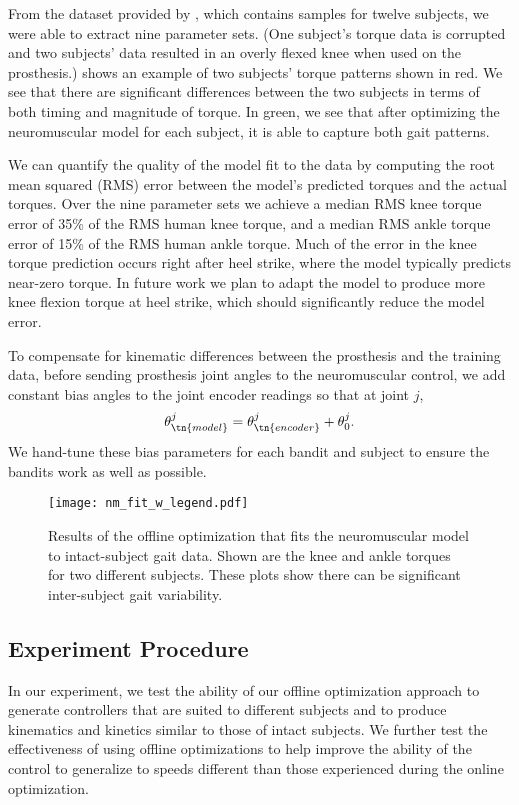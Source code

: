 From the dataset provided by \citet{moore2015elaborate}, which contains samples
for twelve subjects, we were able to extract nine parameter sets. (One subject's
torque data is corrupted and two subjects' data resulted in an overly flexed
knee when used on the prosthesis.)  shows an example of two
subjects' torque patterns shown in red. We see that there are significant
differences between the two subjects in terms of both timing and magnitude of
torque. In green, we see that after optimizing the neuromuscular model for each
subject, it is able to capture both gait patterns. 

We can quantify the quality of the model fit to the data by computing the root
mean squared (RMS) error between the model's predicted torques and the actual
torques. Over the nine parameter sets we achieve a median RMS knee torque error
of 35\% of the RMS human knee torque, and a median RMS ankle torque error of
15\% of the RMS human ankle torque. Much of the error in the knee torque
prediction occurs right after heel strike, where the model typically predicts
near-zero torque. In future work we plan to adapt the model to produce more knee
flexion torque at heel strike, which should significantly reduce the model
error.

To compensate for kinematic differences between the prosthesis and the training
data, before sending prosthesis joint angles to the neuromuscular control, we
add constant bias angles to the joint encoder readings so that at joint $j$,
\begin{align}
    \theta_\tn{model}^j = \theta_\tn{encoder}^j + \theta_0^j.
    \label{eq:bias_param}
\end{align}
We hand-tune these bias parameters for each bandit and subject to ensure the
bandits work as well as possible.
 
\begin{figure}[htb]
    \centering 
    \texttt{[image: nm\_fit\_w\_legend.pdf]}
    \caption{Results of the offline optimization that fits the neuromuscular
    model to intact-subject gait data. Shown are the knee and ankle torques for
    two different subjects. These plots show there can be significant
    inter-subject gait variability.}\label{fig:nm_fit}
\end{figure}

\subsection{Experiment Procedure}
In our experiment, we test the ability of our offline optimization approach to
generate controllers that are suited to different subjects and to produce
kinematics and kinetics similar to those of intact subjects. We further test the
effectiveness of using offline optimizations to help improve the ability of the
control to generalize to speeds different than those experienced during the
online optimization.

